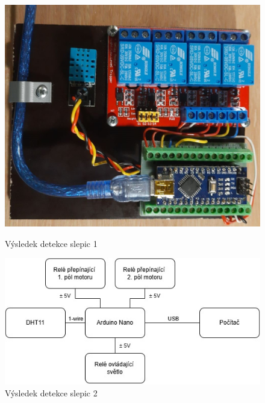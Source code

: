 \begin{figure}[htbp]
    \centering
    \begin{minipage}[b]{0.45\textwidth}
        \centering
        \includegraphics[width=\textwidth]{img/ridici_jednotka}
        \caption{Výsledek detekce slepic 1}
        \label{fig:ridici_jednotka}
    \end{minipage}
    \hfill
    \begin{minipage}[b]{0.45\textwidth}
        \centering
        \includegraphics[width=\textwidth]{img/schema_ridici_jednotky}
        \caption{Výsledek detekce slepic 2}
        \label{fig:schema_ridici_jednotky}
    \end{minipage}
\end{figure}

